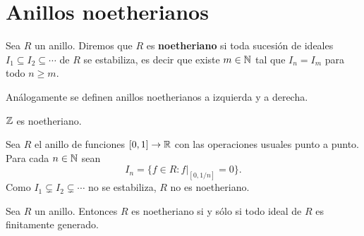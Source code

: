 \chapter{Anillos noetherianos}

\begin{definition}
Sea $R$ un anillo. Diremos que $R$ es \textbf{noetheriano} si toda sucesión de ideales $I_1\subseteq I_2\subseteq\cdots $ de $R$ 
se estabiliza, es decir que existe $m\in\mathbb{N}$ tal que 
$I_n=I_m$ para todo $n\geq m$. 
\end{definition}

Análogamente se definen anillos noetherianos a izquierda y a derecha. 


\begin{example}
$\mathbb{Z}$ es noetheriano.
\end{example}

%
\begin{example}
Sea $R$ el anillo de funciones $[0,1]\to\mathbb{R}$ 
con las operaciones usuales punto a punto. Para cada $n\in\mathbb{N}$ sean  
\[
I_n=\{f\in R:f|_{[0,1/n]}=0\}.
\]
Como $I_1\subsetneq I_2\subsetneq\cdots$ no se estabiliza, $R$ no es noetheriano. 
\end{example}

\begin{theorem}
	Sea $R$ un anillo. Entonces $R$ es noetheriano si y sólo si todo ideal de $R$ es finitamente generado.
\end{theorem}

